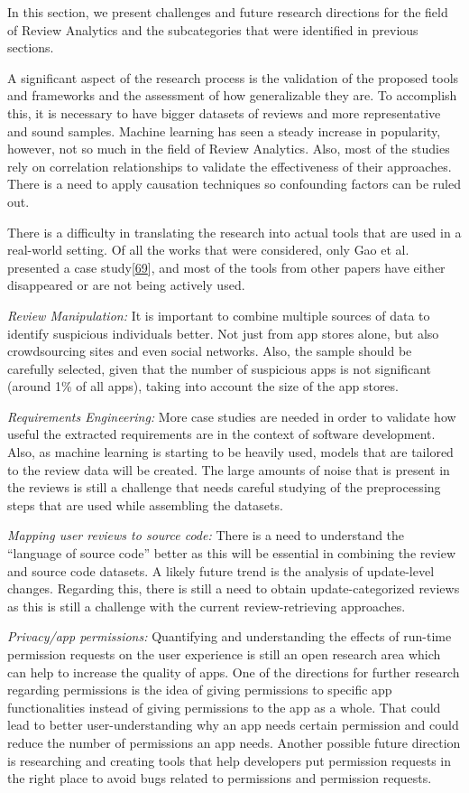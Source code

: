 \documentclass[]{book}
\begin{document}
In this section, we present challenges and future research directions
for the field of Review Analytics and the subcategories that were
identified in previous sections.

A significant aspect of the research process is the validation of the
proposed tools and frameworks and the assessment of how generalizable
they are. To accomplish this, it is necessary to have bigger datasets of
reviews and more representative and sound samples. Machine learning has
seen a steady increase in popularity, however, not so much in the field
of Review Analytics. Also, most of the studies rely on correlation
relationships to validate the effectiveness of their approaches. There
is a need to apply causation techniques so confounding factors can be
ruled out.

There is a difficulty in translating the research into actual tools that
are used in a real-world setting. Of all the works that were considered,
only Gao et al. presented a case
study{[}\protect\hyperlink{ref-gao2018online}{69}{]}, and most of the
tools from other papers have either disappeared or are not being
actively used.

\emph{Review Manipulation:} It is important to combine multiple sources
of data to identify suspicious individuals better. Not just from app
stores alone, but also crowdsourcing sites and even social networks.
Also, the sample should be carefully selected, given that the number of
suspicious apps is not significant (around 1\% of all apps), taking into
account the size of the app stores.

\emph{Requirements Engineering:} More case studies are needed in order
to validate how useful the extracted requirements are in the context of
software development. Also, as machine learning is starting to be
heavily used, models that are tailored to the review data will be
created. The large amounts of noise that is present in the reviews is
still a challenge that needs careful studying of the preprocessing steps
that are used while assembling the datasets.

\emph{Mapping user reviews to source code:} There is a need to
understand the ``language of source code'' better as this will be
essential in combining the review and source code datasets. A likely
future trend is the analysis of update-level changes. Regarding this,
there is still a need to obtain update-categorized reviews as this is
still a challenge with the current review-retrieving approaches.

\emph{Privacy/app permissions:} Quantifying and understanding the
effects of run-time permission requests on the user experience is still
an open research area which can help to increase the quality of apps.
One of the directions for further research regarding permissions is the
idea of giving permissions to specific app functionalities instead of
giving permissions to the app as a whole. That could lead to better
user-understanding why an app needs certain permission and could reduce
the number of permissions an app needs. Another possible future
direction is researching and creating tools that help developers put
permission requests in the right place to avoid bugs related to
permissions and permission requests.
\end{document}
